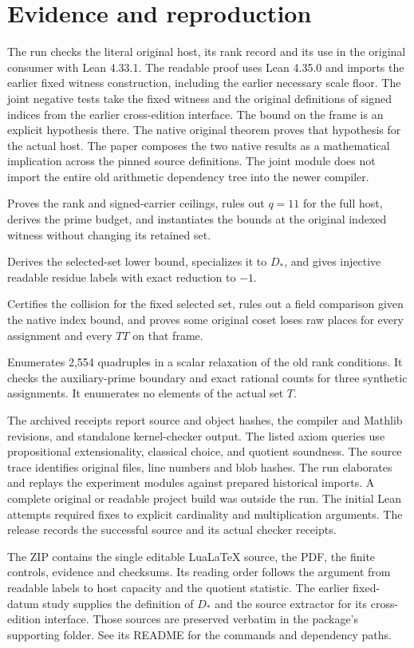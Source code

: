 \documentclass[12pt,letterpaper]{article}
\newcommand{\id}[1]{\ifmmode\text{\small\nolinkurl{#1}}\else{\small\nolinkurl{#1}}\fi}
\begin{document}
\section{Evidence and reproduction}
The run checks the literal original host, its rank record and its use in the original consumer with Lean 4.33.1. The readable proof uses Lean 4.35.0 and imports the earlier fixed witness construction, including the earlier necessary scale floor. The joint negative tests take the fixed witness and the original definitions of signed indices from the earlier cross-edition interface. The bound on the frame is an explicit hypothesis there. The native original theorem proves that hypothesis for the actual host. The paper composes the two native results as a mathematical implication across the pinned source definitions. The joint module does not import the entire old arithmetic dependency tree into the newer compiler.

\begin{description}[leftmargin=1.8em,style=nextline]
\item[\id{OriginalCapacity.lean}] Proves the rank and signed-carrier ceilings, rules out $q=11$ for the full host, derives the prime budget, and instantiates the bounds at the original indexed witness without changing its retained set.
\item[\id{ReadableCapacity.lean}] Derives the selected-set lower bound, specializes it to $D_*$, and gives injective readable residue labels with exact reduction to $-1$.
\item[\id{SameSet.lean}] Certifies the collision for the fixed selected set, rules out a field comparison given the native index bound, and proves some original coset loses raw places for every assignment and every $TT$ on that frame.
\item[\id{controls.py}] Enumerates 2,554 quadruples in a scalar relaxation of the old rank conditions. It checks the auxiliary-prime boundary and exact rational counts for three synthetic assignments. It enumerates no elements of the actual set $T$.
\end{description}

The archived receipts report source and object hashes, the compiler and Mathlib revisions, and standalone kernel-checker output. The listed axiom queries use propositional extensionality, classical choice, and quotient soundness. The source trace identifies original files, line numbers and blob hashes. The run elaborates and replays the experiment modules against prepared historical imports. A complete original or readable project build was outside the run. The initial Lean attempts required fixes to explicit cardinality and multiplication arguments. The release records the successful source and its actual checker receipts.

The ZIP contains the single editable LuaLaTeX source, the PDF, the finite controls, evidence and checksums. Its reading order follows the argument from readable labels to host capacity and the quotient statistic. The earlier fixed-datum study supplies the definition of $D_*$ and the source extractor for its cross-edition interface. Those sources are preserved verbatim in the package's supporting folder. See its README for the commands and dependency paths.
\end{document}
